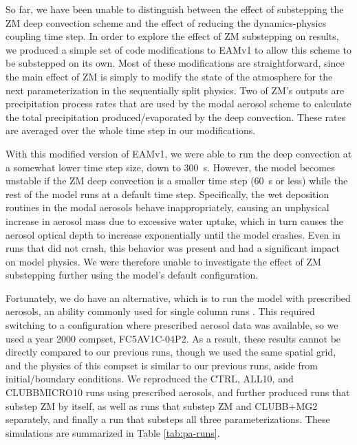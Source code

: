 \documentclass [11pt, proquest] {uwthesis}[2020/02/24]
\begin{document}
\label{sec:zm-substep}

So far, we have been unable to distinguish between the effect of substepping the ZM deep convection scheme and the effect of reducing the dynamics-physics coupling time step. In order to explore the effect of ZM substepping on results, we produced a simple set of code modifications to EAMv1 to allow this scheme to be substepped on its own. Most of these modifications are straightforward, since the main effect of ZM is simply to modify the state of the atmosphere for the next parameterization in the sequentially split physics. Two of ZM's outputs are precipitation process rates that are used by the modal aerosol scheme to calculate the total precipitation produced/evaporated by the deep convection. These rates are averaged over the whole time step in our modifications.

With this modified version of EAMv1, we were able to run the deep convection at a somewhat lower time step size, down to \SI{300}{\second}. However, the model becomes unstable if the ZM deep convection is a smaller time step (\SI{60}{\second} or less) while the rest of the model runs at a default time step. Specifically, the wet deposition routines in the modal aerosols behave inappropriately, causing an unphysical increase in aerosol mass due to excessive water uptake, which in turn causes the aerosol optical depth to increase exponentially until the model crashes. Even in runs that did not crash, this behavior was present and had a significant impact on model physics. We were therefore unable to investigate the effect of ZM substepping further using the model's default configuration.

Fortunately, we do have an alternative, which is to run the model with prescribed aerosols, an ability commonly used for single column runs \parencite{LebassiHabtezion2015}. This required switching to a configuration where prescribed aerosol data was available, so we used a year \num{2000} compset, FC5AV1C-04P2. As a result, these results cannot be directly compared to our previous runs, though we used the same spatial grid, and the physics of this compset is similar to our previous runs, aside from initial/boundary conditions. We reproduced the CTRL, ALL10, and CLUBBMICRO10 runs using prescribed aerosols, and further produced runs that substep ZM by itself, as well as runs that substep ZM and CLUBB+MG2 separately, and finally a run that substeps all three parameterizations. These simulations are summarized in Table \ref{tab:pa-runs}.
\end{document}
